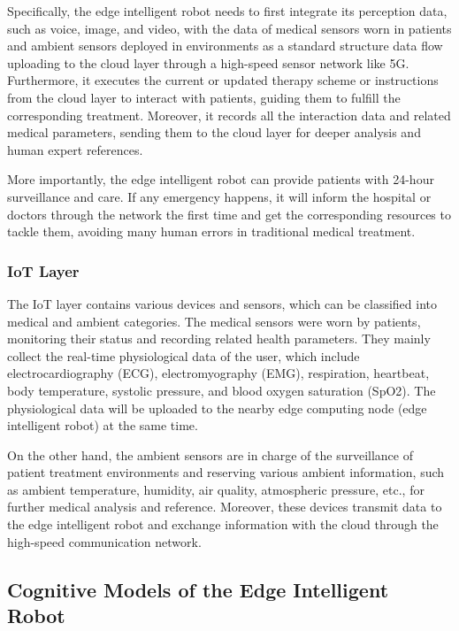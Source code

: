 \documentclass[letterpaper]{article} %
\begin{document}
Specifically, the edge intelligent robot needs to first integrate its perception data, such as voice, image, and video, with the data of medical sensors worn in patients and ambient sensors deployed in environments as a standard structure data flow uploading to the cloud layer through a high-speed sensor network like 5G. Furthermore, it executes the current or updated therapy scheme or instructions from the cloud layer to interact with patients, guiding them to fulfill the corresponding treatment. Moreover, it records all the interaction data and related medical parameters, sending them to the cloud layer for deeper analysis and human expert references.

More importantly, the edge intelligent robot can provide patients with 24-hour surveillance and care. If any emergency happens, it will inform the hospital or doctors through the network the first time and get the corresponding resources to tackle them, avoiding many human errors in traditional medical treatment.

\subsubsection{IoT Layer}

The IoT layer contains various devices and sensors, which can be classified into medical and ambient categories. The medical sensors were worn by patients, monitoring their status and recording related health parameters. They mainly collect the real-time physiological data of the user, which include electrocardiography (ECG), electromyography (EMG), respiration, heartbeat, body temperature, systolic pressure, and blood oxygen saturation (SpO2). The physiological data will be uploaded to the nearby edge computing node (edge intelligent robot) at the same time.

On the other hand, the ambient sensors are in charge of the surveillance of patient treatment environments and reserving various ambient information, such as ambient temperature, humidity, air quality, atmospheric pressure, etc., for further medical analysis and reference. Moreover, these devices transmit data to the edge intelligent robot and exchange information with the cloud through the high-speed communication network.

\subsection{Cognitive Models of the Edge Intelligent Robot}
\end{document}
